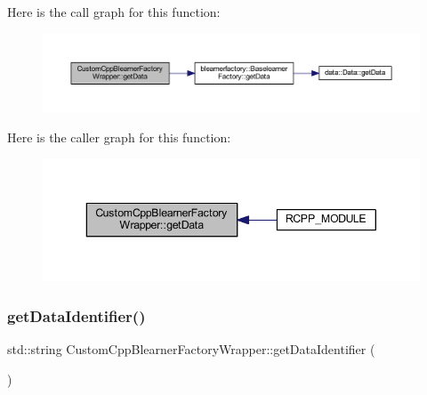 Here is the call graph for this function\+:
\nopagebreak
\begin{figure}[H]
\begin{center}
\leavevmode
\includegraphics[width=350pt]{class_custom_cpp_blearner_factory_wrapper_a0fa7f0c2574f895b66ddc363b5d869ad_cgraph}
\end{center}
\end{figure}
Here is the caller graph for this function\+:\nopagebreak
\begin{figure}[H]
\begin{center}
\leavevmode
\includegraphics[width=343pt]{class_custom_cpp_blearner_factory_wrapper_a0fa7f0c2574f895b66ddc363b5d869ad_icgraph}
\end{center}
\end{figure}
\mbox{\label{class_custom_cpp_blearner_factory_wrapper_a0ec23af6dd4dc8a390465d41be516983}} 
\subsubsection{\texorpdfstring{get\+Data\+Identifier()}{getDataIdentifier()}}
{\footnotesize\ttfamily std\+::string Custom\+Cpp\+Blearner\+Factory\+Wrapper\+::get\+Data\+Identifier (\begin{DoxyParamCaption}{ }\end{DoxyParamCaption})\hspace{0.3cm}{\ttfamily [inline]}}

